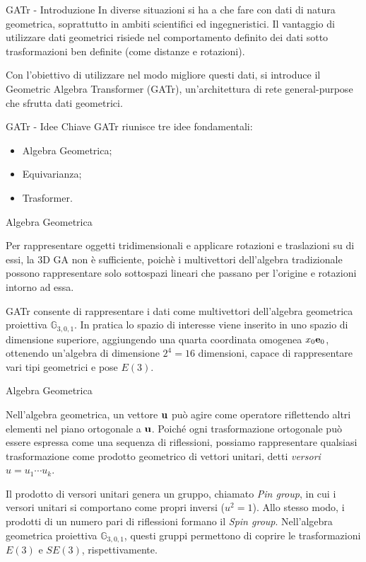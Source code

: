 \begin{frame}{GATr - Introduzione}
    In diverse situazioni si ha a che fare con dati di natura geometrica, soprattutto
    in ambiti scientifici ed ingegneristici. Il vantaggio di utilizzare dati geometrici
    risiede nel comportamento definito dei dati sotto trasformazioni ben definite 
    (come distanze e rotazioni).

    Con l'obiettivo di utilizzare nel modo migliore questi dati, si introduce il 
    Geometric Algebra Transformer (GATr), un'architettura di rete general-purpose 
    che sfrutta dati geometrici. 
\end{frame}

\begin{frame}{GATr - Idee Chiave}
    GATr riunisce tre idee fondamentali: 
    \begin{itemize}
        \item Algebra Geometrica;
        \item Equivarianza;
        \item Trasformer.
    \end{itemize}
\end{frame}

\begin{frame}{Algebra Geometrica}

    Per rappresentare oggetti tridimensionali e applicare rotazioni e traslazioni su di 
    essi, la 3D GA non è sufficiente, poichè i multivettori dell'algebra tradizionale 
    possono rappresentare solo sottospazi lineari che passano per l'origine e rotazioni 
    intorno ad essa. 

    GATr consente di rappresentare i dati come multivettori dell'algebra geometrica 
    proiettiva \(\mathbb{G}_{3,0,1}\). In pratica lo spazio di interesse viene inserito 
    in uno spazio di dimensione superiore, aggiungendo una quarta coordinata omogenea 
    \(x_0 \mathbf{e}_{0}\), ottenendo un'algebra di dimensione \(2^4 = 16\) dimensioni, capace di 
    rappresentare vari tipi geometrici e pose \(E(3)\).
\end{frame}

\begin{frame}{Algebra Geometrica}

    Nell’algebra geometrica, un vettore \( \mathbf{u} \) può agire come operatore riflettendo 
    altri elementi nel piano ortogonale a \( \mathbf{u} \). 
    Poiché ogni trasformazione ortogonale può essere espressa come una sequenza di riflessioni, possiamo 
    rappresentare qualsiasi trasformazione come prodotto geometrico di vettori unitari, 
    detti \textit{versori}  \( u = u_1 \cdots u_k \).

    Il prodotto di versori unitari genera un gruppo, chiamato \textit{Pin group}, 
    in cui i versori unitari si comportano come propri inversi (\( u^2 = 1 \)). 
    Allo stesso modo, i prodotti di un numero pari di riflessioni formano il 
    \textit{Spin group}. Nell’algebra geometrica proiettiva 
    \( \mathbb{G}_{3,0,1} \), questi gruppi permettono di coprire le trasformazioni 
    \( E(3) \) e \( SE(3) \), rispettivamente.
\end{frame}

